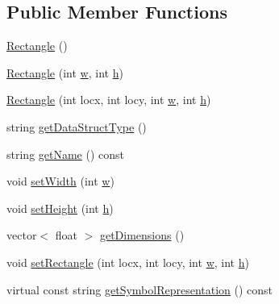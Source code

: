 \subsection*{Public Member Functions}
\begin{DoxyCompactItemize}
\item 
\mbox{\hyperlink{classbridges_1_1_rectangle_a8d5b640b27372d32d7761769df343290}{Rectangle}} ()
\item 
\mbox{\hyperlink{classbridges_1_1_rectangle_ab5b67756e761bdd9515406874fbfb75a}{Rectangle}} (int \mbox{\hyperlink{namespacebridges_acfb0a4f7877d8f63de3e6862004c50edaf1290186a5d0b1ceab27f4e77c0c5d68}{w}}, int \mbox{\hyperlink{namespacebridges_acfb0a4f7877d8f63de3e6862004c50eda2510c39011c5be704182423e3a695e91}{h}})
\item 
\mbox{\hyperlink{classbridges_1_1_rectangle_a0f108bbf4b718aa2e1105383c10ab7d9}{Rectangle}} (int locx, int locy, int \mbox{\hyperlink{namespacebridges_acfb0a4f7877d8f63de3e6862004c50edaf1290186a5d0b1ceab27f4e77c0c5d68}{w}}, int \mbox{\hyperlink{namespacebridges_acfb0a4f7877d8f63de3e6862004c50eda2510c39011c5be704182423e3a695e91}{h}})
\item 
string \mbox{\hyperlink{classbridges_1_1_rectangle_a596586044a960de76ab95b859bf16235}{get\+Data\+Struct\+Type}} ()
\item 
string \mbox{\hyperlink{classbridges_1_1_rectangle_a78d234b0cb0e7263f2380b3a5f454178}{get\+Name}} () const
\item 
void \mbox{\hyperlink{classbridges_1_1_rectangle_ab592c45be7344b4a406d6332b392cb12}{set\+Width}} (int \mbox{\hyperlink{namespacebridges_acfb0a4f7877d8f63de3e6862004c50edaf1290186a5d0b1ceab27f4e77c0c5d68}{w}})
\item 
void \mbox{\hyperlink{classbridges_1_1_rectangle_aa14d6619e60de1d660fa6f3770dfaaa7}{set\+Height}} (int \mbox{\hyperlink{namespacebridges_acfb0a4f7877d8f63de3e6862004c50eda2510c39011c5be704182423e3a695e91}{h}})
\item 
vector$<$ float $>$ \mbox{\hyperlink{classbridges_1_1_rectangle_a459587616a9674f6f0f02bac08589e23}{get\+Dimensions}} ()
\item 
void \mbox{\hyperlink{classbridges_1_1_rectangle_aee11bd9b9601d54c652b5b225c75bbac}{set\+Rectangle}} (int locx, int locy, int \mbox{\hyperlink{namespacebridges_acfb0a4f7877d8f63de3e6862004c50edaf1290186a5d0b1ceab27f4e77c0c5d68}{w}}, int \mbox{\hyperlink{namespacebridges_acfb0a4f7877d8f63de3e6862004c50eda2510c39011c5be704182423e3a695e91}{h}})
\item 
virtual const string \mbox{\hyperlink{classbridges_1_1_rectangle_a509c9489c6f145b684447851736acac5}{get\+Symbol\+Representation}} () const
\end{DoxyCompactItemize}
